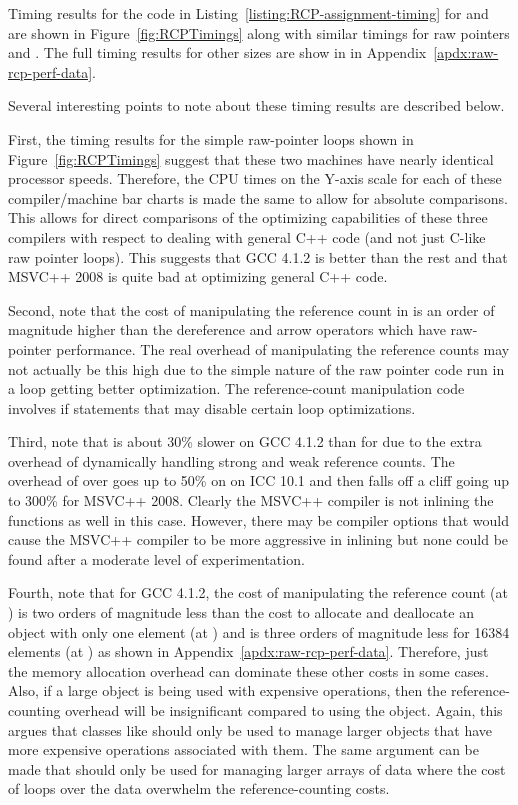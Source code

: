 \documentclass[pdf,ps2pdf,11pt]{SANDreport}
\begin{document}
Timing results for the code in
Listing~\ref{listing:RCP-assignment-timing} for
{} and {} are shown in
Figure~\ref{fig:RCPTimings} along with similar timings for raw
pointers and {}.  The full timing results for
other sizes are show in in Appendix~\ref{apdx:raw-rcp-perf-data}.

Several interesting points to note about these timing results are
described below.

First, the timing results for the simple raw-pointer loops shown in
Figure~\ref{fig:RCPTimings} suggest that these two machines have
nearly identical processor speeds.  Therefore, the CPU times on the
Y-axis scale for each of these compiler/machine bar charts is made the
same to allow for absolute comparisons.  This allows for direct
comparisons of the optimizing capabilities of these three compilers
with respect to dealing with general C++ code (and not just C-like raw
pointer loops).  This suggests that GCC 4.1.2 is better than the rest
and that MSVC++ 2008 is quite bad at optimizing general {}
C++ code.

Second, note that the cost of manipulating the reference count in
{} is an order of magnitude higher than
the dereference and arrow operators which have raw-pointer
performance.  The real overhead of manipulating the reference counts
may not actually be this high due to the simple nature of the raw
pointer code run in a loop getting better optimization.  The
reference-count manipulation code involves if statements that may
disable certain loop optimizations.

Third, note that {} is about 30\% slower on
GCC 4.1.2 than for {} due to the extra
overhead of dynamically handling strong and weak reference counts.
The overhead of {} over {} goes up to
50\% on on ICC 10.1 and then falls off a cliff going up to 300\% for
MSVC++ 2008.  Clearly the MSVC++ compiler is not inlining the
{} functions as well in this case.  However, there may be
compiler options that would cause the MSVC++ compiler to be more
aggressive in inlining but none could be found after a moderate level
of experimentation.

Fourth, note that for GCC 4.1.2, the cost of manipulating the
reference count (at {}) is two orders of magnitude
less than the cost to allocate and deallocate an
{} object with only one element (at
{}) and is three orders of magnitude less for 16384
elements (at {}) as shown in
Appendix~\ref{apdx:raw-rcp-perf-data}.  Therefore, just the memory
allocation overhead can dominate these other costs in some cases.
Also, if a large object is being used with expensive operations, then
the reference-counting overhead will be insignificant compared to
using the object.  Again, this argues that classes like {}
should only be used to manage larger objects that have more expensive
operations associated with them.  The same argument can be made that
{} should only be used for managing larger arrays of
data where the cost of loops over the data overwhelm the
reference-counting costs.
\end{document}
